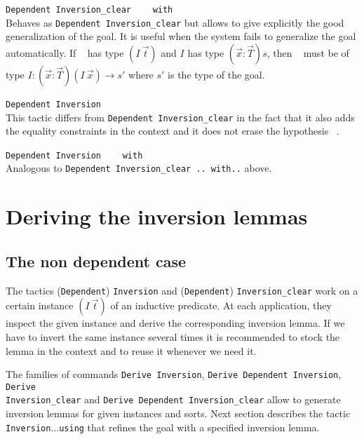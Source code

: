 \begin{Variants}

\item \texttt{Dependent Inversion\_clear } \ident~ \texttt{ with } \term\\
 \noindent Behaves as \texttt{Dependent Inversion\_clear} but allows to give
  explicitly the good generalization of the goal. It is useful when
  the system fails to generalize the goal automatically. If
  \ident~ has type $(I~\vec{t})$ and $I$ has type
  $(\vec{x}:\vec{T})s$,   then \term~  must be of type
  $I:(\vec{x}:\vec{T})(I~\vec{x})\rightarrow s'$ where $s'$ is the
  type of the goal.



\item \texttt{Dependent Inversion} \ident~\\
 This tactic differs from   \texttt{Dependent Inversion\_clear} in the fact that
  it also  adds the equality constraints in the context and
  it does not erase  the hypothesis \ident~.

\item \texttt{Dependent Inversion } \ident~ \texttt{ with } \term \\
  Analogous to \texttt{Dependent Inversion\_clear .. with..} above. 
\end{Variants}



\section[Deriving the inversion lemmas]{Deriving the inversion lemmas\label{inversion_derivation}}
\subsection{The non dependent case}

The tactics (\texttt{Dependent}) \texttt{Inversion} and (\texttt{Dependent})
{\tt Inversion\_clear} work on a
certain instance $(I~\vec{t})$ of an inductive predicate. At each
application, they inspect the given instance and derive the
corresponding inversion lemma.  If we have to invert the same
instance several times it is recommended to stock the lemma in the
context and to reuse it whenever we need it.

The families of commands \texttt{Derive Inversion}, \texttt{Derive
Dependent Inversion}, \texttt{Derive} \\ {\tt Inversion\_clear} and \texttt{Derive Dependent Inversion\_clear}
allow to generate inversion lemmas for given instances and sorts.  Next
section describes the tactic \texttt{Inversion}$\ldots$\texttt{using} that refines the
goal with a specified inversion lemma.

